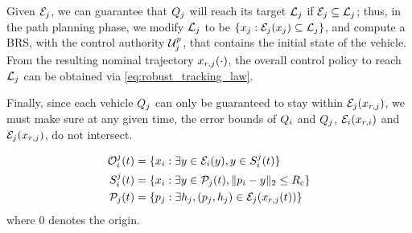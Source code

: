 Given $\mathcal{E}_j$, we can guarantee that $Q_j$ will reach its target $\mathcal{L}_j$ if $\mathcal{E}_j \subseteq \mathcal{L}_j$; thus, in the path planning phase, we modify $\mathcal{L}_j$ to be $\{x_j: \mathcal{E}_j(x_j) \subseteq \mathcal{L}_j\}$, and compute a BRS, with the control authority $\mathcal{U}^p_j$, that contains the initial state of the vehicle. From the resulting nominal trajectory $x_{r,j}(\cdot)$, the overall control policy to reach $\mathcal{L}_j$ can be obtained via \eqref{eq:robust_tracking_law}.

Finally, since each vehicle $Q_j$ can only be guaranteed to stay within $\mathcal{E}_j(x_{r,j})$, we must make sure at any given time, the error bounds of $Q_i$ and $Q_j$, $\mathcal{E}_i(x_{r,i})$ and $\mathcal{E}_j(x_{r,j})$, do not intersect. %


\begin{equation} 
\label{eqn:rttObs}
\begin{aligned}
\ioset_i^j(t) &= \{\state_i: \exists y \in \errorbound_i(y), y \in S_i^j(t)\} \\
S_i^j(t) &= \{\state_i: \exists y \in \pfrs_j(t), \|\pos_i - y\|_2 \le \rc \} \\
\pfrs_j(t) &= \{\pos_j: \exists \npos_j, (\pos_j, \npos_j) \in \errorbound_j(\state_{r,j}(t)) \}
\end{aligned}
\end{equation}
\noindent where $0$ denotes the origin. 

